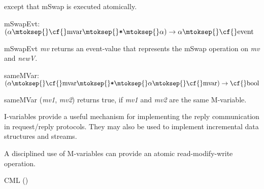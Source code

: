 \begin{descr}
\begin{speccomment}
\begin{code}
\end{code}
 	  except that {\cf \small m\-Swap} is executed atomically.     \end{speccomment}
\item {}{} {\cf mSwapEvt: \((\alpha\mtoksep{}\mbox{\cf{}mvar}\mtoksep{}\verb,*,\mtoksep{}\alpha)\rightarrow \alpha\mtoksep{}\mbox{\cf{}event}\)}\label{val-SYNC_VAR.mSwapEvt}


\begin{speccomment}
\item {\cf \small m\-Swap\-Evt \mbox{\cf \small \textit{mv}}           } 
returns an event-value that represents the {\cf \small m\-Swap} 	  operation on \mbox{\cf \small \textit{mv}} and \mbox{\cf \small \textit{new\-V}}.     \end{speccomment}
\item {}{} {\cf sameMVar: \((\alpha\mtoksep{}\mbox{\cf{}mvar}\mtoksep{}\verb,*,\mtoksep{}\alpha\mtoksep{}\mbox{\cf{}mvar})\rightarrow \mbox{\cf{}bool}\)}\label{val-SYNC_VAR.sameMVar}


\begin{speccomment}
\item {\cf \small same\-MVar (\mbox{\cf \small \textit{mv1}}, \mbox{\cf \small \textit{mv2}})           } 
returns {\cf \small true}, if \mbox{\cf \small \textit{mv1}} and \mbox{\cf \small \textit{mv2}} are the same 	  M-variable.   \end{speccomment}
\end{descr}


I-variables provide a useful mechanism for implementing the reply communication in request/reply protocols. They may also be used to implement incremental data structures and streams.

A disciplined use of M-variables can provide an atomic read-modify-write operation.
\begin{seealso}
{\cf CML} (\pageref{str-CML})
\end{seealso}
